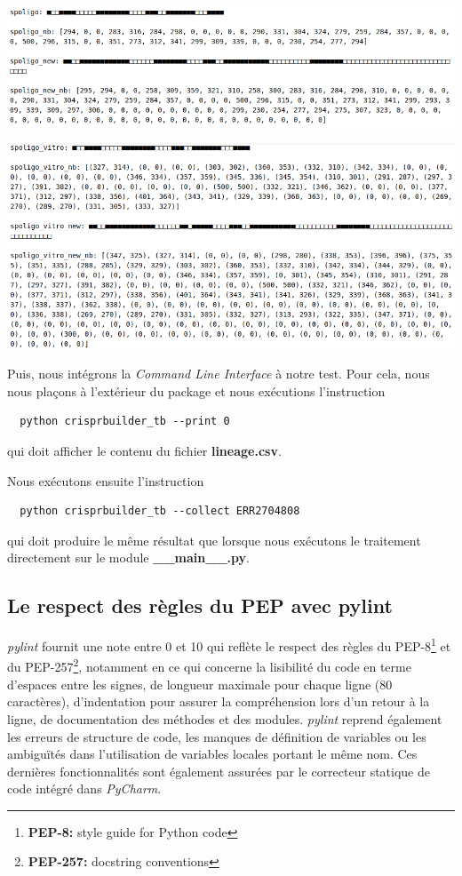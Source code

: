 \documentclass[twoside,a4paper,11pt,frenchb,openany]{report}
\begin{document}
\includegraphics[width=16.5cm]{spoligo1.png}

\includegraphics[width=16.5cm]{spoligo2.png}

Puis, nous intégrons la \textit{Command Line Interface} à notre test. Pour cela, nous nous plaçons à l'extérieur du package et nous exécutions l'instruction

\begin{verbatim}
  python crisprbuilder_tb --print 0
\end{verbatim}

qui doit afficher le contenu du fichier \textbf{lineage.csv}.

Nous exécutons ensuite l'instruction

\begin{verbatim}
  python crisprbuilder_tb --collect ERR2704808
\end{verbatim}

qui doit produire le même résultat que lorsque nous exécutons le traitement directement sur le module \textbf{\_\_main\_\_.py}.






\subsection{Le respect des règles du PEP avec pylint}

\textit{pylint} fournit une note entre 0 et 10 qui reflète le respect des règles du PEP-8\footnote{\textbf{PEP-8:} style guide for Python code} et du PEP-257\footnote{\textbf{PEP-257:} docstring conventions}, notamment en ce qui concerne la lisibilité du code en terme d'espaces entre les signes, de longueur maximale pour chaque ligne (80 caractères), d'indentation pour assurer la compréhension lors d'un retour à la ligne, de documentation des méthodes et des modules. \textit{pylint} reprend également les erreurs de structure de code, les manques de définition de variables ou les ambiguïtés dans l'utilisation de variables locales portant le même nom. Ces dernières fonctionnalités sont également assurées par le correcteur statique de code intégré dans \textit{PyCharm}.
\end{document}
